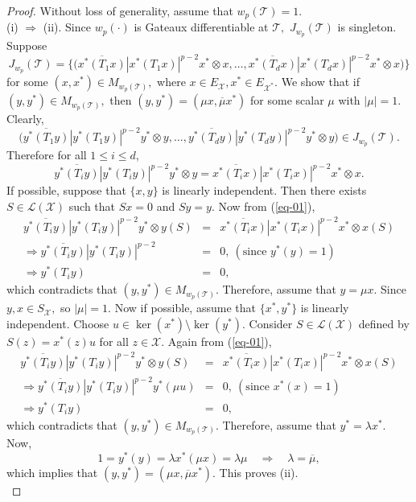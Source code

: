 \documentclass{amsart}
\theoremstyle{definition}
\theoremstyle{remark}
\numberwithin{equation}{section}
\begin{document}
\begin{proof}
	Without loss of generality, assume that $w_p(\mathcal{T})=1.$ \\
(i) $\Rightarrow $ (ii). Since $w_p(\cdot)$ is Gateaux differentiable at $\mathcal{T},$ $J_{w_p}(\mathcal{T})$ is singleton. Suppose $$J_{w_p}(\mathcal{T})=\bigg\{\bigg(\overline{x^*(T_1x)}|x^*(T_1x)|^{p-2}x^*\otimes x,\ldots,\overline{x^*(T_dx)}|x^*(T_dx)|^{p-2}x^*\otimes x\bigg)\bigg\}$$
for some $(x,x^*)\in M_{w_p(\mathcal{T})},$ where $x\in E_{\mathcal{X}}, x^*\in E_{\mathcal{X}^*}.$ We show that if
 $(y,y^*)\in M_{w_p(\mathcal{T})},$ then $(y,y^*)=(\mu x,\overline{\mu}x^*)$ for some scalar $\mu$ with $|\mu|=1.$ Clearly,
 \[\bigg(\overline{y^*(T_1y)}|y^*(T_1y)|^{p-2}y^*\otimes y,\ldots,\overline{y^*(T_dy)}|y^*(T_dy)|^{p-2}y^*\otimes y\bigg)\in J_{w_p}(\mathcal{T}).\]  
 Therefore for all $1\leq i\leq d$, 
 \begin{equation}\label{eq-01}
 \overline{y^*(T_iy)}|y^*(T_iy)|^{p-2}y^*\otimes y=\overline{x^*(T_ix)}|x^*(T_ix)|^{p-2}x^*\otimes x.
\end{equation}
 If possible, suppose that $\{x,y\}$ is linearly independent. Then there exists $S\in \mathcal{L}(\mathcal{X})$ such that $Sx=0$ and $Sy=y.$ Now from (\ref{eq-01}),
 \begin{eqnarray*}
 	 \overline{y^*(T_iy)}|y^*(T_iy)|^{p-2}y^*\otimes y(S)&=&\overline{x^*(T_ix)}|x^*(T_ix)|^{p-2}x^*\otimes x(S)\\
 	 \Rightarrow \overline{y^*(T_iy)}|y^*(T_iy)|^{p-2}&=&0, ~(\text{since } y^*(y)=1)\\
 	 \Rightarrow y^*(T_iy)&=&0,
 	\end{eqnarray*}
 which contradicts that $(y,y^*)\in M_{w_p(\mathcal{T})}.$ Therefore, assume that $y=\mu x.$ Since $y,x\in S_{\mathcal{X}},$ so $|\mu|=1.$ Now if possible, assume that $\{x^*,y^*\}$ is linearly independent. Choose $u\in \ker(x^*)\setminus \ker(y^*).$ Consider $S\in \mathcal{L}(\mathcal{X})$ defined by $S(z)=x^*(z)u$ for all $z\in \mathcal{X}.$ Again from (\ref{eq-01}), 
  \begin{eqnarray*}
 	\overline{y^*(T_iy)}|y^*(T_iy)|^{p-2}y^*\otimes y(S)&=&\overline{x^*(T_ix)}|x^*(T_ix)|^{p-2}x^*\otimes x(S)\\
 	\Rightarrow \overline{y^*(T_iy)}|y^*(T_iy)|^{p-2}y^*(\mu u)&=&0, ~(\text{since } x^*(x)=1)\\
 	\Rightarrow y^*(T_iy)&=&0,
 \end{eqnarray*}
 which contradicts that $(y,y^*)\in M_{w_p(\mathcal{T})}.$ Therefore, assume that $y^*=\lambda x^*.$  Now,
 \[1=y^*(y)=\lambda x^*(\mu x)=\lambda \mu\quad \Rightarrow \quad \lambda =\overline{\mu},\]
 which implies that $(y,y^*)=(\mu x,\overline{\mu}x^*).$ This proves (ii).\\
 

\end{proof}
\end{document}
